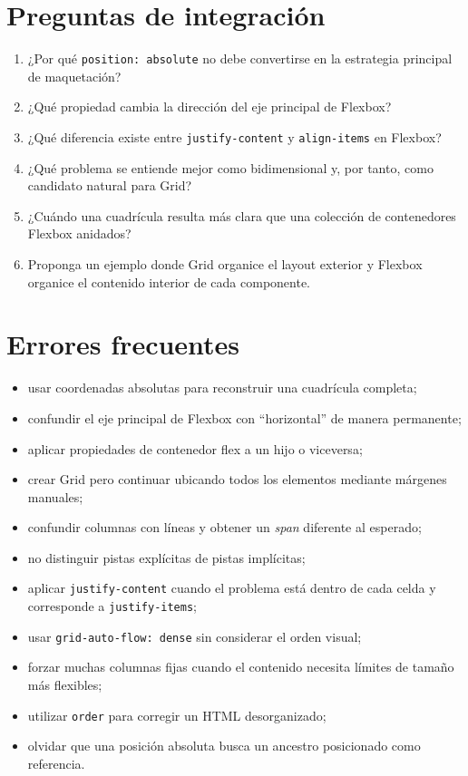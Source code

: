 \documentclass[11pt]{article}
\begin{document}
\section{Preguntas de integración}
\begin{enumerate}
    \item ¿Por qué \texttt{position: absolute} no debe convertirse en la estrategia
    principal de maquetación?
    \item ¿Qué propiedad cambia la dirección del eje principal de Flexbox?
    \item ¿Qué diferencia existe entre \texttt{justify-content} y
    \texttt{align-items} en Flexbox?
    \item ¿Qué problema se entiende mejor como bidimensional y, por tanto, como
    candidato natural para Grid?
    \item ¿Cuándo una cuadrícula resulta más clara que una colección de
    contenedores Flexbox anidados?
    \item Proponga un ejemplo donde Grid organice el layout exterior y Flexbox
    organice el contenido interior de cada componente.
\end{enumerate}

\section{Errores frecuentes}
\begin{itemize}
    \item usar coordenadas absolutas para reconstruir una cuadrícula completa;
    \item confundir el eje principal de Flexbox con ``horizontal'' de manera
    permanente;
    \item aplicar propiedades de contenedor flex a un hijo o viceversa;
    \item crear Grid pero continuar ubicando todos los elementos mediante márgenes
    manuales;
    \item confundir columnas con líneas y obtener un \textit{span} diferente al
    esperado;
    \item no distinguir pistas explícitas de pistas implícitas;
    \item aplicar \texttt{justify-content} cuando el problema está dentro de cada
    celda y corresponde a \texttt{justify-items};
    \item usar \texttt{grid-auto-flow: dense} sin considerar el orden visual;
    \item forzar muchas columnas fijas cuando el contenido necesita límites de
    tamaño más flexibles;
    \item utilizar \texttt{order} para corregir un HTML desorganizado;
    \item olvidar que una posición absoluta busca un ancestro posicionado como
    referencia.
\end{itemize}
\end{document}
